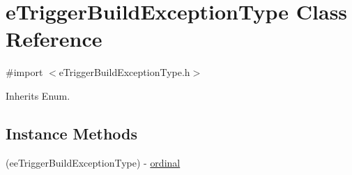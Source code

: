 \hypertarget{interfacee_trigger_build_exception_type}{}\section{e\+Trigger\+Build\+Exception\+Type Class Reference}
\label{interfacee_trigger_build_exception_type}


{\ttfamily \#import $<$e\+Trigger\+Build\+Exception\+Type.\+h$>$}



Inherits Enum.

\subsection*{Instance Methods}
\begin{DoxyCompactItemize}
\item 
(ee\+Trigger\+Build\+Exception\+Type) -\/ \hyperlink{interfacee_trigger_build_exception_type_a132b86de9d697b206140ee6a32f409e9}{ordinal}
\end{DoxyCompactItemize}

